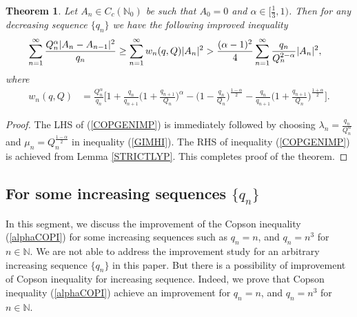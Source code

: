 \documentclass[12pt]{amsart}
\newtheorem{Theorem}{\sc Theorem}[section]
\theoremstyle{definition}
\theoremstyle{plain}
\theoremstyle{definition}
\numberwithin{equation}{section}
\begin{document}
\begin{Theorem}{\label{COPTHEO}}
Let $A_{n}\in C_{c}(\mathbb{N}_0)$ be such that $A_{0}=0$ and $\alpha\in[\frac{1}{3},1)$. Then for any decreasing sequence $\{q_{n}\}$ we have the following improved inequality
\begin{align}{\label{COPGENIMP}}
&\displaystyle\sum_{n=1}^{\infty}\frac{Q_{n}^{\alpha}|A_n-A_{n-1}|^{2}}{q_{n}}\geq\displaystyle\sum_{n=1}^{\infty}w_{n}(q,Q)|A_{n}|^{2}
>\frac{(\alpha-1)^{2}}{4}\displaystyle\sum_{n=1}^{\infty}\frac{q_{n}}{Q_{n}^{2-\alpha}}|A_{n}|^{2},
\end{align}
where
\begin{align*}
w_{n}(q,Q)& =\frac{Q_{n}^{\alpha}}{q_{n}}\Big[1+\frac{q_{n}}{q_{n+1}}\Big(1+\frac{q_{n+1}}{Q_{n}}\Big)^{\alpha}-\Big(1-\frac{q_{n}}{Q_{n}}\Big)^{\frac{1-\alpha}{2}}
-\frac{q_{n}}{q_{n+1}}\Big(1+\frac{q_{n+1}}{Q_{n}}\Big)^{\frac{1+\alpha}{2}}\Big].
\end{align*}
\end{Theorem}
\begin{proof}
The LHS of (\ref{COPGENIMP}) is immediately followed by choosing $\lambda_{n}=\frac{q_{n}}{Q_{n}^{\alpha}}$ and $\mu_{n}=Q_{n}^{\frac{1-\alpha}{2}}$ in inequality (\ref{GIMHI}). The RHS of inequality (\ref{COPGENIMP}) is achieved from Lemma \ref{STRICTLYP}. This completes proof of the theorem.
\end{proof}

\subsection{For some increasing sequences $\{q_n\}$}
In this segment, we discuss the improvement of the Copson inequality (\ref{alphaCOPI}) for some increasing sequences such as $q_n=n$, and $q_n=n^3$ for $n\in \mathbb{N}$. We are not able to address the improvement study for an arbitrary increasing sequence $\{q_n\}$ in this paper. But there is a possibility of improvement of Copson inequality for increasing sequence. Indeed, we prove that Copson inequality (\ref{alphaCOPI}) achieve an improvement for $q_n=n$, and $q_n=n^3$ for $n\in \mathbb{N}$.
\end{document}

